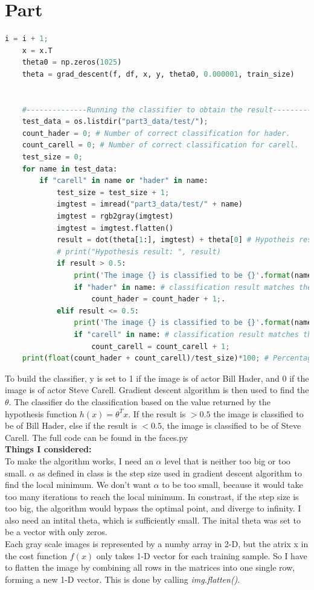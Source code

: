 \documentclass{article}
\newcommand{\enterProblemHeader}[1]{
}
\newcommand{\exitProblemHeader}[1]{
}
\newcounter{homeworkProblemCounter} %
\newcommand{\homeworkProblemName}{}
\newenvironment{homeworkProblem}[1][Part \arabic{homeworkProblemCounter}]{ %
\stepcounter{homeworkProblemCounter} %
\renewcommand{\homeworkProblemName}{#1} %
\section{\homeworkProblemName} %
\enterProblemHeader{\homeworkProblemName} %
}{
\exitProblemHeader{\homeworkProblemName} %
}
\begin{document}
\begin{homeworkProblem}
\begin{lstlisting}[language=Python]
            i = i + 1;
    x = x.T
    theta0 = np.zeros(1025)
    theta = grad_descent(f, df, x, y, theta0, 0.000001, train_size)
    
    
    #--------------Running the classifier to obtain the result---------------#
    test_data = os.listdir("part3_data/test/");
    count_hader = 0; # Number of correct classification for hader.
    count_carell = 0; # Number of correct classification for carell.
    test_size = 0;
    for name in test_data:
        if "carell" in name or "hader" in name:
            test_size = test_size + 1;
            imgtest = imread("part3_data/test/" + name)
            imgtest = rgb2gray(imgtest)
            imgtest = imgtest.flatten()
            result = dot(theta[1:], imgtest) + theta[0] # Hypotheis result
            # print("Hypothesis result: ", result)
            if result > 0.5:
                print('The image {} is classified to be {}'.format(name,'Bill Hader'))
                if "hader" in name: # classification result matches the label
                    count_hader = count_hader + 1;.
            elif result <= 0.5:
                print('The image {} is classified to be {}'.format(name,'Steve Carell'))
                if "carell" in name: # classification result matches the label
                    count_carell = count_carell + 1;
    print(float(count_hader + count_carell)/test_size)*100; # Percentage result
\end{lstlisting}
To build the classifier, y is set to 1 if the image is of actor Bill Hader, and 0 if the image is of actor Steve Carell. Gradient descent algorithm is then used to find the $\theta$. The classifier do the classification based on the value returned by the hypothesis function $h(x)=\theta^Tx$. If the result is $>0.5$ the image is classified to be of Bill Hader, else if the result is $<0.5$, the image is classified to be of Steve Carell. The full code can be found in the faces.py \\

\textbf{Things I considered:} \\
To make the algorithm works, I need an $\alpha$ level that is neither too big or too small. $\alpha$ as defined in class is the step size used in gradient descent algorithm to find the local minimum. We don't want $\alpha$ to be too small, because it would take too many iterations to reach the local minimum. In constrast, if the step size is too big, the algorithm would bypass the optimal point, and diverge to infinity. I also need an intital theta, which is sufficiently small. The inital theta was set to be a vector with only zeros.\\

Each gray scale images is represented by a numby array in 2-D, but the atrix x in the cost function $f(x)$ only takes 1-D vector for each training sample. So I have to flatten the image by combining all rows in the matrices into one single row, forming a new 1-D vector. This is done by calling \textit{img.flatten()}.

\clearpage
\end{homeworkProblem}
\end{document}
